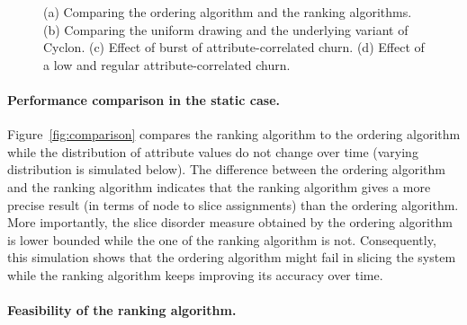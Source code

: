 \documentclass[times,10pt,twocolumn]{article}
\begin{document}
\begin{figure*}[t]
  \begin{center}
    \hspace{1cm}
    \hspace{1cm}
    \caption{
(a) Comparing the ordering algorithm and the ranking algorithms.
       (b) Comparing the uniform drawing and the underlying variant of Cyclon.
       (c) Effect of burst of attribute-correlated churn.
       (d) Effect of a low and regular attribute-correlated churn.
       }
  \end{center}
\end{figure*}





\paragraph{Performance comparison in the static case.}

Figure~\ref{fig:comparison} compares the ranking algorithm to the ordering algorithm
while the distribution of attribute values do not change over time 
(varying distribution is simulated below).
The difference between the ordering algorithm and the ranking algorithm
indicates that the ranking algorithm gives a more precise result (in terms of node to 
slice assignments) than the ordering algorithm.  
More importantly, the slice disorder measure obtained by the ordering algorithm is
lower bounded while the one of the ranking algorithm is not.
Consequently, this simulation shows that the ordering algorithm might fail in 
slicing the system while the ranking algorithm keeps improving its accuracy over 
time.

\paragraph{Feasibility of the ranking algorithm.}
\end{document}
